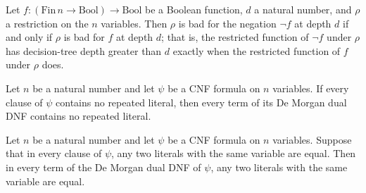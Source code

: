 \begin{lemma}
\label{SwitchingLemmaCNF.IsBadRestriction_neg}
\leanok
{}
Let $f : (\mathrm{Fin}\,n \to \mathrm{Bool}) \to \mathrm{Bool}$ be a Boolean function,
$d$ a natural number, and $\rho$ a restriction on the $n$ variables. Then $\rho$ is bad
for the negation $\lnot f$ at depth $d$ if and only if $\rho$ is bad for $f$ at depth
$d$; that is, the restricted function of $\lnot f$ under $\rho$ has decision-tree depth
greater than $d$ exactly when the restricted function of $f$ under $\rho$ does.
\end{lemma}

\begin{lemma}
\label{CNF.dual_nodup}
\leanok
{}
Let $n$ be a natural number and let $\psi$ be a CNF formula on $n$ variables. If every
clause of $\psi$ contains no repeated literal, then every term of its De Morgan dual DNF
contains no repeated literal.
\end{lemma}

\begin{lemma}
\label{CNF.dual_inj}
\leanok
{}
Let $n$ be a natural number and let $\psi$ be a CNF formula on $n$ variables. Suppose
that in every clause of $\psi$, any two literals with the same variable are equal. Then
in every term of the De Morgan dual DNF of $\psi$, any two literals with the same
variable are equal.
\end{lemma}

